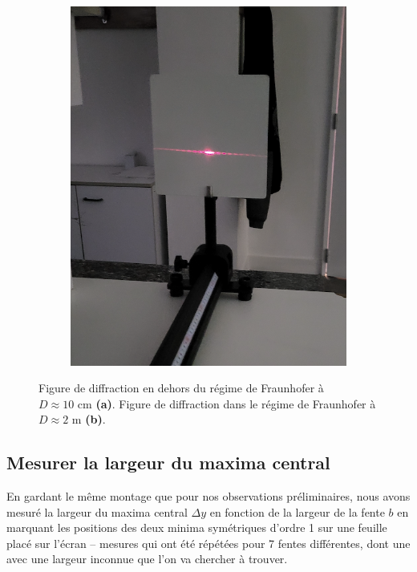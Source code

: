 \documentclass{article}
\begin{document}
\begin{figure}[H]
\begin{subfigure}[b]{0.3\textwidth}
        \includegraphics[width=\textwidth]{figs/fraunhofer_2.png}
        \caption{}\label{fig:fraunhofer_2}
    \end{subfigure}
    \caption{Figure de diffraction en dehors du régime de Fraunhofer à $D \approx 10 \textrm{ cm}$ \textbf{(a)}. 
    Figure de diffraction dans le régime de Fraunhofer à $D \approx 2 \textrm{ m} $ \textbf{(b)}.}
    \label{fig:diff_1}
\end{figure}

\subsection{Mesurer la largeur du maxima central}

En gardant le même montage que pour nos observations préliminaires, nous avons 
mesuré la largeur du maxima central $\Delta y$ en fonction de la largeur de la 
fente $b$ en marquant les positions des deux minima symétriques d'ordre 1 sur une 
feuille placé sur l'écran – mesures qui ont été répétées pour 7 fentes différentes, dont une avec une largeur inconnue que l'on va chercher à trouver.
\end{document}
